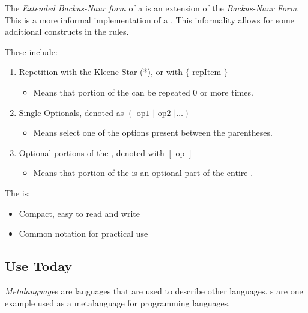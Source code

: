 \begin{definition}\label{def:CFG_EBNF_Form}
  The \emph{Extended Backus-Naur form} of a  is an extension of the \emph{Backus-Naur Form}.
  This is a more informal implementation of a .
  This informality allows for some additional constructs in the  rules.

  These include:
  \begin{enumerate}[noitemsep]

  \item Repetition with the Kleene Star (*), or with $\lbrace \text{ repItem } \rbrace$
    \begin{itemize}[noitemsep]
    \item Means that portion of the  can be repeated 0 or more times.
    \end{itemize}
  \item Single Optionals, denoted as $(\text{ op1 } \vert \text{ op2 } \vert \ldots)$
    \begin{itemize}[noitemsep]
    \item Means select one of the options present between the parentheses.
    \end{itemize}
  \item Optional portions of the , denoted with $[\text{ op }]$
    \begin{itemize}[noitemsep]
    \item Means that portion of the  is an optional part of the entire .
    \end{itemize}
  \end{enumerate}

  The  is:
  \begin{itemize}[noitemsep]
  \item Compact, easy to read and write
  \item Common notation for practical use
  \end{itemize}
\end{definition}

\subsection{Use Today}\label{subsec:Use_Today}
\begin{definition}[Metalanguage]\label{def:Metalanguage}
  \emph{Metalanguage}s are languages that are used to describe other languages.
  s are one example used as a metalanguage for programming languages.
\end{definition}

